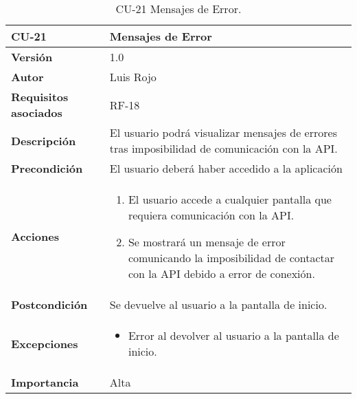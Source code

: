 \begin{table}[p]
	\centering
	\begin{tabularx}{\linewidth}{ p{} p{} }
		\toprule
		\textbf{CU-21}    & \textbf{Mensajes de Error}\\
		\toprule
		\textbf{Versión}              & 1.0    \\
		\textbf{Autor}                & Luis Rojo \\
		\textbf{Requisitos asociados} & RF-18 \\
		\textbf{Descripción}          & El usuario podrá visualizar mensajes de errores tras imposibilidad de comunicación con la API. \\
		\textbf{Precondición}         &  El usuario deberá haber accedido a la aplicación \\
		\textbf{Acciones}             &
		\begin{enumerate}
			\def\labelenumi{\arabic{enumi}.}
			\tightlist
			\item El usuario accede a cualquier pantalla que requiera comunicación con la API.
                \item Se mostrará un mensaje de error comunicando la imposibilidad de contactar con la API debido a error de conexión.
		\end{enumerate}\\
		\textbf{Postcondición}        & Se devuelve al usuario a la pantalla de inicio.  \\
		\textbf{Excepciones}          &  
            \begin{itemize}
                \item Error al devolver al usuario a la pantalla de inicio.
            \end{itemize}
           \\
		\textbf{Importancia}          & Alta  \\
		\bottomrule
	\end{tabularx}
	\caption{CU-21 Mensajes de Error.}
\end{table}